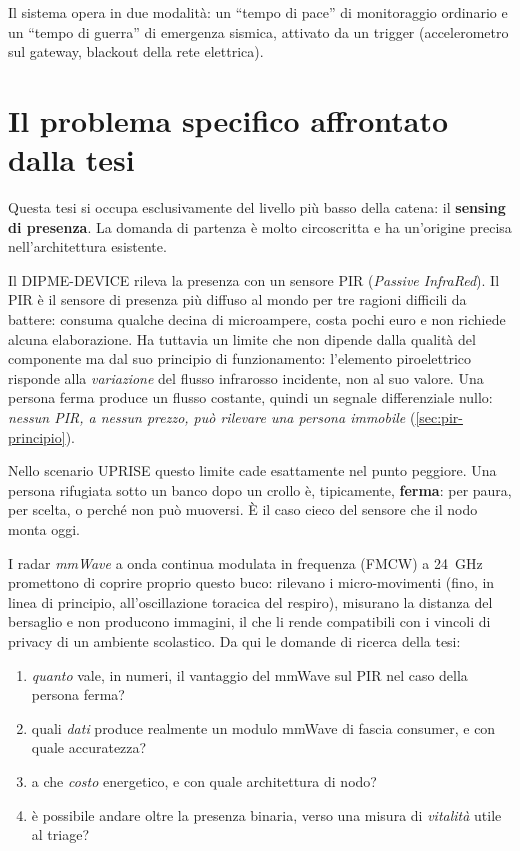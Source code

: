 Il sistema opera in due modalità: un ``tempo di pace'' di monitoraggio ordinario
e un ``tempo di guerra'' di emergenza sismica, attivato da un trigger (accelerometro
sul gateway, blackout della rete elettrica).


\section{Il problema specifico affrontato dalla tesi}
\label{sec:problema}

Questa tesi si occupa esclusivamente del livello più basso della catena: il
\textbf{sensing di presenza}. La domanda di partenza è molto circoscritta e ha
un'origine precisa nell'architettura esistente.

Il DIPME-DEVICE rileva la presenza con un sensore PIR (\emph{Passive InfraRed}).
Il PIR è il sensore di presenza più diffuso al mondo per tre ragioni difficili
da battere: consuma qualche decina di microampere, costa pochi euro e non richiede
alcuna elaborazione. Ha tuttavia un limite che non dipende dalla qualità del
componente ma dal suo principio di funzionamento: l'elemento piroelettrico risponde
alla \emph{variazione} del flusso infrarosso incidente, non al suo valore. Una
persona ferma produce un flusso costante, quindi un segnale differenziale nullo:
\emph{nessun PIR, a nessun prezzo, può rilevare una persona immobile}
(\cref{sec:pir-principio}).

Nello scenario UPRISE questo limite cade esattamente nel punto peggiore. Una
persona rifugiata sotto un banco dopo un crollo è, tipicamente, \textbf{ferma}:
per paura, per scelta, o perché non può muoversi. È il caso cieco del sensore
che il nodo monta oggi.

I radar \emph{mmWave} a onda continua modulata in frequenza (FMCW) a 24~GHz
promettono di coprire proprio questo buco: rilevano i micro-movimenti
(fino, in linea di principio, all'oscillazione toracica del respiro), misurano la
distanza del bersaglio e non producono immagini, il che li rende compatibili con i
vincoli di privacy di un ambiente scolastico. Da qui le domande di ricerca della
tesi:

\begin{enumerate}[leftmargin=2em,itemsep=2pt]
  \item \emph{quanto} vale, in numeri, il vantaggio del mmWave sul PIR nel caso
        della persona ferma?
  \item quali \emph{dati} produce realmente un modulo mmWave di fascia consumer, e
        con quale accuratezza?
  \item a che \emph{costo} energetico, e con quale architettura di nodo?
  \item è possibile andare oltre la presenza binaria, verso una misura di
        \emph{vitalità} utile al triage?
\end{enumerate}

